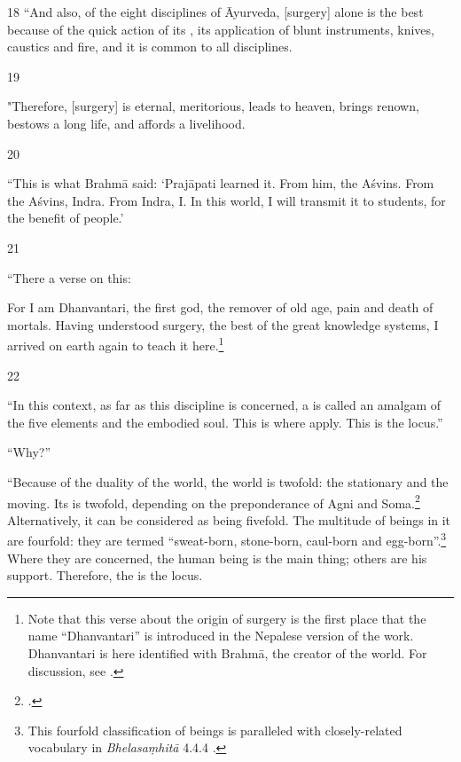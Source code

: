 \begin{translation}
    \item[18] 
“And also, of the eight disciplines of Āyurveda, [surgery]
alone is the best because of the quick action of its
, its application of blunt instruments, knives,
caustics and fire, and it is common to all disciplines.
    
    \item[19] 
    
"Therefore, [surgery] is eternal, meritorious, leads to heaven,
brings renown, bestows a long life, and affords a livelihood.
    
    \item[20] 
    
“This is what Brahmā said: `Prajāpati learned it. From him, the
Aśvins. From the Aśvins, Indra. From Indra, I. In this world, I will
transmit it to students, for the benefit of people.'
    
  \item[21]   
  
“There a verse on this:   
    \begin{sloka}
        For I am Dhanvantari, the first god, the remover of old age,
pain and death of mortals. Having understood surgery, the
best of the great knowledge systems, I arrived on earth again
to teach it here.\footnote{Note that this verse about the
    origin of surgery is the first place that the name
    “Dhanvantari” is introduced in the Nepalese version of the
    work. Dhanvantari is here identified with Brahmā, the creator
    of the world. For discussion, see \cite{birc-2021}.}
    \end{sloka}    
    
    
    \item[22] 
    
“In this context, as far as this discipline is concerned, a
 is called an amalgam of the five elements
and the embodied soul.  This is where  apply.
This is the locus.”
    
“Why?”
    
“Because of the duality of the world, the world is twofold: the
stationary and the moving. Its  is twofold,
depending on the preponderance of Agni and
Soma.\footcite[See][]{wuja-2004}  Alternatively, it can be considered
as being fivefold.  The multitude of beings in it are fourfold: they
are termed “sweat-born, stone-born, caul-born and
egg-born”.\footnote{This fourfold classification of beings is
    paralleled with closely-related vocabulary in  \emph{Bhelasaṃhitā}
    4.4.4 \parencites[206]{kris-2000}[81]{mook-1921}.}  Where they are
    concerned, the human being is the main thing; others are his support.
    Therefore, the  is the locus.
    

\end{translation}
